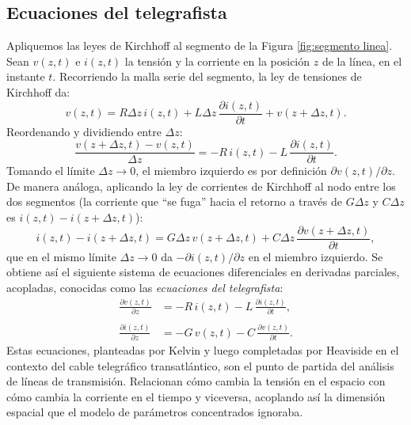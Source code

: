 \subsection*{Ecuaciones del telegrafista}

Apliquemos las leyes de Kirchhoff al segmento de la Figura \ref{fig:segmento linea}. Sean $v(z,t)$ e $i(z,t)$ la tensión y la corriente en la posición $z$ de la línea, en el instante $t$. Recorriendo la malla serie del segmento, la ley de tensiones de Kirchhoff da:
\begin{equation*}
    v(z,t) = R\Delta z\, i(z,t) + L\Delta z\, \frac{\partial i(z,t)}{\partial t} + v(z+\Delta z,t).
\end{equation*}
Reordenando y dividiendo entre $\Delta z$:
\begin{equation*}
    \frac{v(z+\Delta z,t) - v(z,t)}{\Delta z} = -R\, i(z,t) - L\, \frac{\partial i(z,t)}{\partial t}.
\end{equation*}
Tomando el límite $\Delta z \to 0$, el miembro izquierdo es por definición $\partial v(z,t)/\partial z$. De manera análoga, aplicando la ley de corrientes de Kirchhoff al nodo entre los dos segmentos (la corriente que ``se fuga'' hacia el retorno a través de $G\Delta z$ y $C\Delta z$ es $i(z,t)-i(z+\Delta z,t)$):
\begin{equation*}
    i(z,t) - i(z+\Delta z, t) = G\Delta z\, v(z+\Delta z,t) + C \Delta z\, \frac{\partial v(z+\Delta z,t)}{\partial t},
\end{equation*}
que en el mismo límite $\Delta z \to 0$ da $-\partial i(z,t)/\partial z$ en el miembro izquierdo. Se obtiene así el siguiente sistema de ecuaciones diferenciales en derivadas parciales, acopladas, conocidas como las \emph{ecuaciones del telegrafista}:
\begin{subequations}\label{eq:telegrafista}
\begin{align}
    \frac{\partial v(z,t)}{\partial z} &= -R\, i(z,t) - L\, \frac{\partial i(z,t)}{\partial t}, \\
    \nonumber \\
    \frac{\partial i(z,t)}{\partial z} &= -G\, v(z,t) - C\, \frac{\partial v(z,t)}{\partial t}.
\end{align}
\end{subequations}
Estas ecuaciones, planteadas por Kelvin y luego completadas por Heaviside en el contexto del cable telegráfico transatlántico, son el punto de partida del análisis de líneas de transmisión. Relacionan cómo cambia la tensión en el espacio con cómo cambia la corriente en el tiempo y viceversa, acoplando así la dimensión espacial que el modelo de parámetros concentrados ignoraba.

